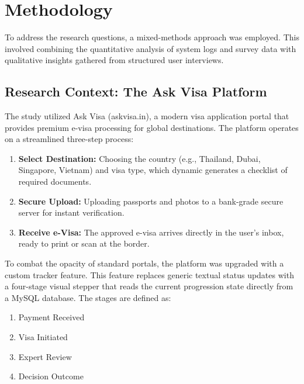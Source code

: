 \documentclass[journal, 10pt, twoside]{IEEEtran}
\begin{document}
\section{Methodology}
\label{sec:methodology}

To address the research questions, a mixed-methods approach was employed. This involved combining the quantitative analysis of system logs and survey data with qualitative insights gathered from structured user interviews.

\subsection{Research Context: The Ask Visa Platform}
The study utilized Ask Visa (askvisa.in), a modern visa application portal that provides premium e-visa processing for global destinations. The platform operates on a streamlined three-step process:
\begin{enumerate}
    \item \textbf{Select Destination:} Choosing the country (e.g., Thailand, Dubai, Singapore, Vietnam) and visa type, which dynamic generates a checklist of required documents.
    \item \textbf{Secure Upload:} Uploading passports and photos to a bank-grade secure server for instant verification.
    \item \textbf{Receive e-Visa:} The approved e-visa arrives directly in the user's inbox, ready to print or scan at the border.
\end{enumerate}

To combat the opacity of standard portals, the platform was upgraded with a custom tracker feature. This feature replaces generic textual status updates with a four-stage visual stepper that reads the current progression state directly from a MySQL database. The stages are defined as:
\begin{enumerate}
    \item Payment Received
    \item Visa Initiated
    \item Expert Review
    \item Decision Outcome
\end{enumerate}
\end{document}

